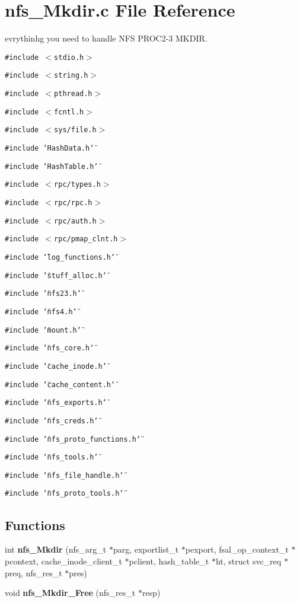 \section{nfs\_\-Mkdir.c File Reference}
\label{nfs__Mkdir_8c}
evrythinhg you need to handle NFS PROC2-3 MKDIR. 

{\tt \#include $<$stdio.h$>$}\par
{\tt \#include $<$string.h$>$}\par
{\tt \#include $<$pthread.h$>$}\par
{\tt \#include $<$fcntl.h$>$}\par
{\tt \#include $<$sys/file.h$>$}\par
{\tt \#include \char`\"{}Hash\-Data.h\char`\"{}}\par
{\tt \#include \char`\"{}Hash\-Table.h\char`\"{}}\par
{\tt \#include $<$rpc/types.h$>$}\par
{\tt \#include $<$rpc/rpc.h$>$}\par
{\tt \#include $<$rpc/auth.h$>$}\par
{\tt \#include $<$rpc/pmap\_\-clnt.h$>$}\par
{\tt \#include \char`\"{}log\_\-functions.h\char`\"{}}\par
{\tt \#include \char`\"{}stuff\_\-alloc.h\char`\"{}}\par
{\tt \#include \char`\"{}nfs23.h\char`\"{}}\par
{\tt \#include \char`\"{}nfs4.h\char`\"{}}\par
{\tt \#include \char`\"{}mount.h\char`\"{}}\par
{\tt \#include \char`\"{}nfs\_\-core.h\char`\"{}}\par
{\tt \#include \char`\"{}cache\_\-inode.h\char`\"{}}\par
{\tt \#include \char`\"{}cache\_\-content.h\char`\"{}}\par
{\tt \#include \char`\"{}nfs\_\-exports.h\char`\"{}}\par
{\tt \#include \char`\"{}nfs\_\-creds.h\char`\"{}}\par
{\tt \#include \char`\"{}nfs\_\-proto\_\-functions.h\char`\"{}}\par
{\tt \#include \char`\"{}nfs\_\-tools.h\char`\"{}}\par
{\tt \#include \char`\"{}nfs\_\-file\_\-handle.h\char`\"{}}\par
{\tt \#include \char`\"{}nfs\_\-proto\_\-tools.h\char`\"{}}\par
\subsection*{Functions}
\begin{CompactItemize}
\item 
int {\bf nfs\_\-Mkdir} (nfs\_\-arg\_\-t $\ast$parg, exportlist\_\-t $\ast$pexport, fsal\_\-op\_\-context\_\-t $\ast$pcontext, cache\_\-inode\_\-client\_\-t $\ast$pclient, hash\_\-table\_\-t $\ast$ht, struct svc\_\-req $\ast$preq, nfs\_\-res\_\-t $\ast$pres)
\item 
void {\bf nfs\_\-Mkdir\_\-Free} (nfs\_\-res\_\-t $\ast$resp)
\end{CompactItemize}


